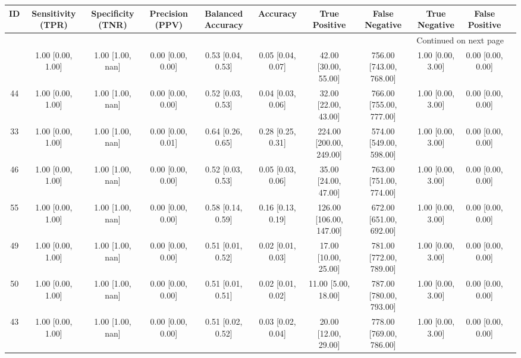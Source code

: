 \documentclass[8pt]{article}
\begin{document}
\begin{center}
\begin{footnotesize}
\begin{longtable}{|ccccccccccc|}
\toprule
 ID &  Sensitivity (TPR) & Specificity (TNR) &    Precision (PPV) &  Balanced Accuracy &           Accuracy &            True Positive &           False Negative &      True Negative &     False Positive \\
\midrule
\endhead
\midrule
\multicolumn{10}{r}{{Continued on next page}} \\
\midrule
\endfoot

\bottomrule
\endlastfoot
 45 &  1.00 [0.00, 1.00] &  1.00 [1.00, nan] &  0.00 [0.00, 0.00] &  0.53 [0.04, 0.53] &  0.05 [0.04, 0.07] &     42.00 [30.00, 55.00] &  756.00 [743.00, 768.00] &  1.00 [0.00, 3.00] &  0.00 [0.00, 0.00] \\
 44 &  1.00 [0.00, 1.00] &  1.00 [1.00, nan] &  0.00 [0.00, 0.00] &  0.52 [0.03, 0.53] &  0.04 [0.03, 0.06] &     32.00 [22.00, 43.00] &  766.00 [755.00, 777.00] &  1.00 [0.00, 3.00] &  0.00 [0.00, 0.00] \\
 33 &  1.00 [0.00, 1.00] &  1.00 [1.00, nan] &  0.00 [0.00, 0.01] &  0.64 [0.26, 0.65] &  0.28 [0.25, 0.31] &  224.00 [200.00, 249.00] &  574.00 [549.00, 598.00] &  1.00 [0.00, 3.00] &  0.00 [0.00, 0.00] \\
 46 &  1.00 [0.00, 1.00] &  1.00 [1.00, nan] &  0.00 [0.00, 0.00] &  0.52 [0.03, 0.53] &  0.05 [0.03, 0.06] &     35.00 [24.00, 47.00] &  763.00 [751.00, 774.00] &  1.00 [0.00, 3.00] &  0.00 [0.00, 0.00] \\
 55 &  1.00 [0.00, 1.00] &  1.00 [1.00, nan] &  0.00 [0.00, 0.00] &  0.58 [0.14, 0.59] &  0.16 [0.13, 0.19] &  126.00 [106.00, 147.00] &  672.00 [651.00, 692.00] &  1.00 [0.00, 3.00] &  0.00 [0.00, 0.00] \\
 49 &  1.00 [0.00, 1.00] &  1.00 [1.00, nan] &  0.00 [0.00, 0.00] &  0.51 [0.01, 0.52] &  0.02 [0.01, 0.03] &     17.00 [10.00, 25.00] &  781.00 [772.00, 789.00] &  1.00 [0.00, 3.00] &  0.00 [0.00, 0.00] \\
 50 &  1.00 [0.00, 1.00] &  1.00 [1.00, nan] &  0.00 [0.00, 0.00] &  0.51 [0.01, 0.51] &  0.02 [0.01, 0.02] &      11.00 [5.00, 18.00] &  787.00 [780.00, 793.00] &  1.00 [0.00, 3.00] &  0.00 [0.00, 0.00] \\
 43 &  1.00 [0.00, 1.00] &  1.00 [1.00, nan] &  0.00 [0.00, 0.00] &  0.51 [0.02, 0.52] &  0.03 [0.02, 0.04] &     20.00 [12.00, 29.00] &  778.00 [769.00, 786.00] &  1.00 [0.00, 3.00] &  0.00 [0.00, 0.00] \\

\end{longtable}
\end{footnotesize}
\end{center}
\end{document}
